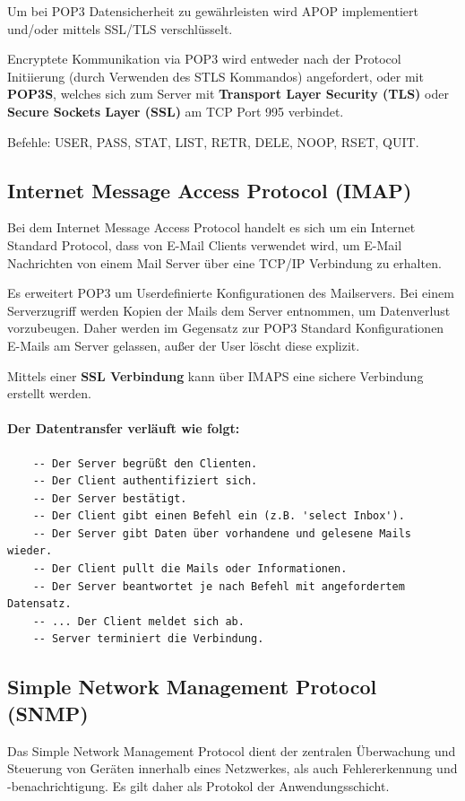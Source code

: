 \documentclass{scrartcl}
\begin{document}
    Um bei POP3 Datensicherheit zu gewährleisten wird APOP implementiert und/oder mittels SSL/TLS verschlüsselt. 

    Encryptete Kommunikation via POP3 wird entweder nach der Protocol Initiierung (durch Verwenden des STLS Kommandos) angefordert, 
    oder mit \textbf{POP3S}, welches sich zum Server mit \textbf{Transport Layer Security (TLS)} oder \textbf{Secure Sockets Layer (SSL)} am TCP Port 995 verbindet.
    
    Befehle: USER, PASS, STAT, LIST, RETR, DELE, NOOP, RSET, QUIT.

    \subsection{Internet Message Access Protocol (IMAP)}
    \label{protocols:imap}
    Bei dem Internet Message Access Protocol handelt es sich um ein Internet Standard Protocol, 
    dass von E-Mail Clients verwendet wird, 
    um E-Mail Nachrichten von einem Mail Server über eine TCP/IP Verbindung zu erhalten.

    Es erweitert POP3 um Userdefinierte Konfigurationen des Mailservers. 
    Bei einem Serverzugriff werden Kopien der Mails dem Server entnommen, 
    um Datenverlust vorzubeugen.
    Daher werden im Gegensatz zur POP3 Standard Konfigurationen E-Mails am Server gelassen,
    außer der User löscht diese explizit.

    Mittels einer \textbf{SSL Verbindung} kann über IMAPS eine sichere Verbindung erstellt werden.

    \paragraph{Der Datentransfer verläuft wie folgt:}
    \begin{verbatim}
    -- Der Server begrüßt den Clienten.
    -- Der Client authentifiziert sich.
    -- Der Server bestätigt.
    -- Der Client gibt einen Befehl ein (z.B. 'select Inbox').
    -- Der Server gibt Daten über vorhandene und gelesene Mails wieder.
    -- Der Client pullt die Mails oder Informationen.
    -- Der Server beantwortet je nach Befehl mit angefordertem Datensatz.
    -- ... Der Client meldet sich ab.
    -- Server terminiert die Verbindung.
    \end{verbatim}
    
    \subsection{Simple Network Management Protocol (SNMP)}
    \label{protocols:snmp}
    Das Simple Network Management Protocol dient der zentralen Überwachung und Steuerung von Geräten innerhalb eines Netzwerkes, als auch Fehlererkennung und -benachrichtigung. Es gilt daher als Protokol der Anwendungsschicht.
    
\end{document}

